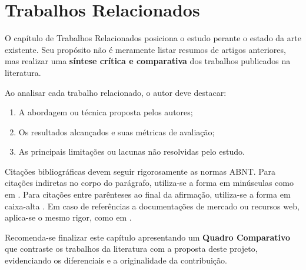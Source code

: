 \chapter{Trabalhos Relacionados}
\label{chap:trabalhosrelacionados}

O capítulo de Trabalhos Relacionados posiciona o estudo perante o estado da arte existente. Seu propósito não é meramente listar resumos de artigos anteriores, mas realizar uma \textbf{síntese crítica e comparativa} dos trabalhos publicados na literatura.

Ao analisar cada trabalho relacionado, o autor deve destacar:
\begin{enumerate}
    \item A abordagem ou técnica proposta pelos autores;
    \item Os resultados alcançados e suas métricas de avaliação;
    \item As principais limitações ou lacunas não resolvidas pelo estudo.
\end{enumerate}

Citações bibliográficas devem seguir rigorosamente as normas ABNT. Para citações indiretas no corpo do parágrafo, utiliza-se a forma em minúsculas como em . Para citações entre parênteses ao final da afirmação, utiliza-se a forma em caixa-alta \cite{akhtar2018threat}. Em caso de referências a documentações de mercado ou recursos web, aplica-se o mesmo rigor, como em .

Recomenda-se finalizar este capítulo apresentando um \textbf{Quadro Comparativo} que contraste os trabalhos da literatura com a proposta deste projeto, evidenciando os diferenciais e a originalidade da contribuição.
